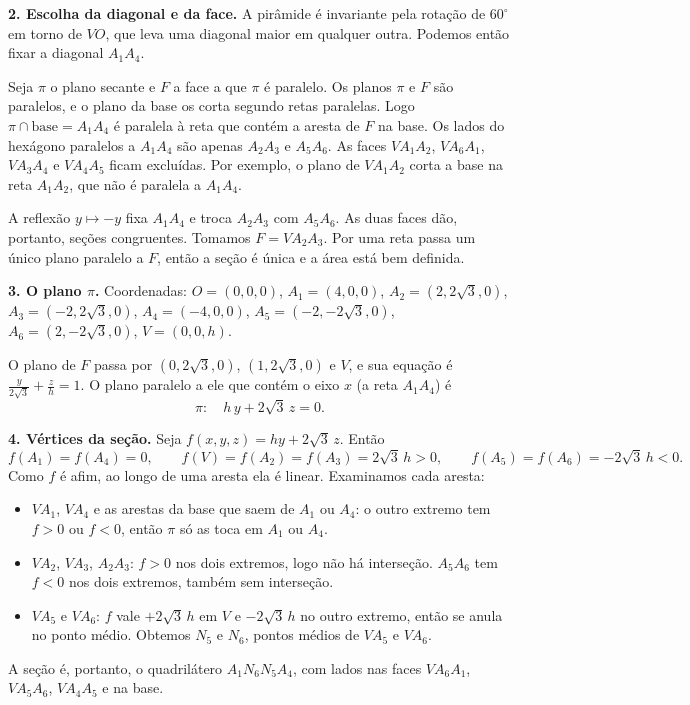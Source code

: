 \documentclass{article}%
\begin{document}
\textbf{2. Escolha da diagonal e da face.} A pirâmide é invariante pela rotação de $60^\circ$ em torno de $VO$, que leva uma diagonal maior em qualquer outra. Podemos então fixar a diagonal $A_1A_4$.

Seja $\pi$ o plano secante e $F$ a face a que $\pi$ é paralelo. Os planos $\pi$ e $F$ são paralelos, e o plano da base os corta segundo retas paralelas. Logo $\pi\cap\text{base}=A_1A_4$ é paralela à reta que contém a aresta de $F$ na base. Os lados do hexágono paralelos a $A_1A_4$ são apenas $A_2A_3$ e $A_5A_6$. As faces $VA_1A_2$, $VA_6A_1$, $VA_3A_4$ e $VA_4A_5$ ficam excluídas. Por exemplo, o plano de $VA_1A_2$ corta a base na reta $A_1A_2$, que não é paralela a $A_1A_4$.

A reflexão $y\mapsto -y$ fixa $A_1A_4$ e troca $A_2A_3$ com $A_5A_6$. As duas faces dão, portanto, seções congruentes. Tomamos $F=VA_2A_3$. Por uma reta passa um único plano paralelo a $F$, então a seção é única e a área está bem definida.

\textbf{3. O plano $\pi$.} Coordenadas: $O=(0,0,0)$, $A_1=(4,0,0)$, $A_2=(2,2\sqrt3,0)$, $A_3=(-2,2\sqrt3,0)$, $A_4=(-4,0,0)$, $A_5=(-2,-2\sqrt3,0)$, $A_6=(2,-2\sqrt3,0)$, $V=(0,0,h)$.

O plano de $F$ passa por $(0,2\sqrt3,0)$, $(1,2\sqrt3,0)$ e $V$, e sua equação é $\frac{y}{2\sqrt3}+\frac{z}{h}=1$. O plano paralelo a ele que contém o eixo $x$ (a reta $A_1A_4$) é
\[
\pi:\quad h\,y+2\sqrt3\,z=0 .
\]

\textbf{4. Vértices da seção.} Seja $f(x,y,z)=hy+2\sqrt3\,z$. Então
\[
f(A_1)=f(A_4)=0,\qquad f(V)=f(A_2)=f(A_3)=2\sqrt3\,h>0,\qquad f(A_5)=f(A_6)=-2\sqrt3\,h<0 .
\]
Como $f$ é afim, ao longo de uma aresta ela é linear. Examinamos cada aresta:
\begin{itemize}
\item $VA_1$, $VA_4$ e as arestas da base que saem de $A_1$ ou $A_4$: o outro extremo tem $f>0$ ou $f<0$, então $\pi$ só as toca em $A_1$ ou $A_4$.
\item $VA_2$, $VA_3$, $A_2A_3$: $f>0$ nos dois extremos, logo não há interseção. $A_5A_6$ tem $f<0$ nos dois extremos, também sem interseção.
\item $VA_5$ e $VA_6$: $f$ vale $+2\sqrt3\,h$ em $V$ e $-2\sqrt3\,h$ no outro extremo, então se anula no ponto médio. Obtemos $N_5$ e $N_6$, pontos médios de $VA_5$ e $VA_6$.
\end{itemize}
A seção é, portanto, o quadrilátero $A_1N_6N_5A_4$, com lados nas faces $VA_6A_1$, $VA_5A_6$, $VA_4A_5$ e na base.
\end{document}
